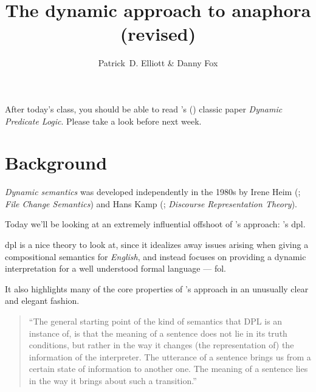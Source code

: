 \documentclass[nols,twoside,nofonts,nobib,nohyper]{tufte-handout}
\title{The dynamic approach to anaphora (revised)}
\author[Patrick D. Elliott \& Danny Fox]{Patrick~D. Elliott \& Danny Fox}
\theoremstyle{definition}
\begin{document}
\maketitle%

\begin{tcolorbox}[title=Readings]
After today's class, you should be able to read \citeauthor{GroenendijkStokhof1991}'s (\citeyear{GroenendijkStokhof1991}) classic paper \textit{Dynamic Predicate Logic}. Please take a look before next week.
\end{tcolorbox}

\section{Background}

\textit{Dynamic semantics} was developed independently in the 1980s by Irene Heim (\citeyear{Heim1982}; \textit{File Change Semantics}) and Hans Kamp (\citeyear{Kamp1981}; \textit{Discourse Representation Theory}).

Today we'll be looking at an extremely influential offshoot of \citeauthor{Heim1982}'s approach: \citeauthor{GroenendijkStokhof1991}'s \ac{dpl}.

\ac{dpl} is a nice theory to look at, since it idealizes away issues arising when giving a compositional semantics for \textit{English}, and instead focuses on providing a dynamic interpretation for a well understood formal language --- \ac{fol}.

It also highlights many of the core properties of \citeauthor{Heim1982}'s approach in an unusually clear and elegant fashion.

\begin{quotation}
\enquote{The general starting point of the kind of semantics that DPL is
an instance of, is that the meaning of a sentence does not lie in its truth conditions, but rather in the way it changes (the representation of) the information of the interpreter. The utterance
of a sentence brings us from a certain state of information to
another one. The meaning of a sentence lies in the way it brings
about such a transition.}\\
\phantom{,}\hfill\citep[p. 43]{GroenendijkStokhof1991}
\end{quotation}
\end{document}
